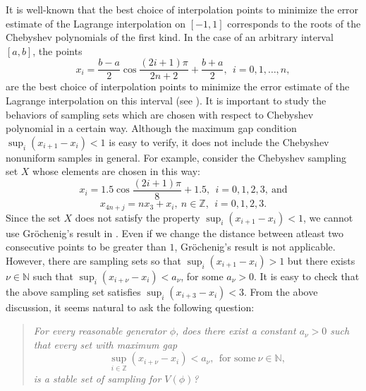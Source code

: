 \documentclass[a4paper,12pt,reqno]{amsart}
\theoremstyle{plain}
\numberwithin{equation}{section}
\theoremstyle{definition}
\newcounter {own}
\begin{document}
It is well-known that the best choice  of interpolation points to minimize  
the  error  estimate of the  Lagrange interpolation on  $[-1,1]$ corresponds to the  roots of the Chebyshev 
polynomials  of the first kind. In the case of an arbitrary interval $[a,b]$, the points
$$x_i=\dfrac{b-a}{2}\cos\dfrac{(2i+1)\pi}{2n+2}+\dfrac{b+a}{2},~~i=0,1,\dots,n,$$
are the best choice  of interpolation points to minimize  
the  error  estimate of the  Lagrange interpolation on this interval (see \cite{Davis}).
It is important to study the behaviors of sampling sets which  are chosen with respect to Chebyshev polynomial in a certain way. 
Although the maximum gap condition $\sup_{i}(x_{i+1}-x_i)<1$ is easy to verify, it does not include the Chebyshev nonuniform samples in general. 
For example, consider the  Chebyshev sampling set $X$  whose elements are chosen in this way:
$$x_i=1.5\cos\dfrac{(2i+1)\pi}{8}+1.5,~~i=0,1,2,3,~\text{and}$$
$$x_{4n+j}=nx_3+x_i,~n\in\mathbb{Z}, ~~i=0,1,2,3.$$
Since the set $X$ does not satisfy the property $\sup_{i}(x_{i+1}-x_i)<1$, we cannot use Gr\"{o}chenig's result in \cite{Grochenig}.
Even if we change the distance between atleast two consecutive points to be greater than $1$, Gr\"{o}chenig's result is not applicable.
However, there are sampling sets so that $\sup_{i}(x_{i+1}-x_i)>1$ but there exists $\nu\in\mathbb{N}$ such that $\sup_{i}(x_{i+\nu}-x_i)<a_\nu$, for some $a_\nu>0$.
It is easy to check that the above sampling set satisfies  $\sup_{i}(x_{i+3}-x_i)<3$. From the above discussion, it seems natural to ask the following question: 
\begin{quotation}
\begin{tcolorbox}
\textit{For every reasonable generator $\phi$, does there  exist  a constant  $a_\nu>0$
such  that  every  set  with  maximum gap $$\sup\limits_{i\in\mathbb{Z}}(x_{i+\nu}-x_i)<a_\nu,~~\text{for some}~\nu\in\mathbb{N},$$ is a stable set of sampling for $V(\phi)$?}
\end{tcolorbox}
\end{quotation}
\end{document}
